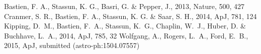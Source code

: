 \documentclass[apjl]{emulateapj}
\begin{document}

\begin{thebibliography}{99}
 Bastien, 
F. A., Stassun, K. G., Basri, G. \& Pepper, J., 2013, Nature, 500, 427
Cranmer, S. R., Bastien, F. A., Stassun, K. G. \& Saar, S. H., 2014, ApJ, 781, 
124
Kipping, D.~M., Bastien, F.~A., Stassun, K.~G., Chaplin, W.~J., Huber, D. \&
Buchhave, L.~A., 2014, ApJ, 785, 32
Wolfgang, A., Rogers, L.~A., Ford, E.~B., 2015, ApJ, submitted 
(astro-ph:1504.07557)
\end{thebibliography}
\end{document}
